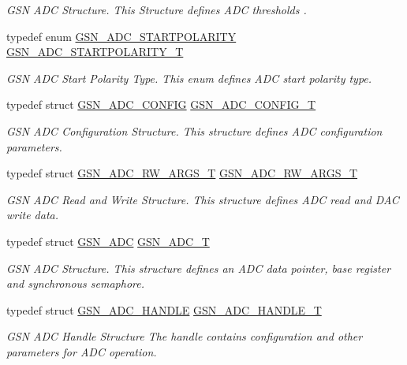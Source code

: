 \begin{DoxyCompactItemize}
\begin{DoxyCompactList}\small\item\em GSN ADC Structure. This Structure defines ADC thresholds . \end{DoxyCompactList}\item 
typedef enum \hyperlink{a00643_ga022c151fd88b9ea5c11ad9fbfb415a18}{GSN\_\-ADC\_\-STARTPOLARITY} \hyperlink{a00643_gaaafebe738a6902a342c1226ce5ea8598}{GSN\_\-ADC\_\-STARTPOLARITY\_\-T}
\begin{DoxyCompactList}\small\item\em GSN ADC Start Polarity Type. This enum defines ADC start polarity type. \end{DoxyCompactList}\item 
typedef struct \hyperlink{a00023}{GSN\_\-ADC\_\-CONFIG} \hyperlink{a00643_ga791ca7ba8984ef3e22b1790a1abd2bb4}{GSN\_\-ADC\_\-CONFIG\_\-T}
\begin{DoxyCompactList}\small\item\em GSN ADC Configuration Structure. This structure defines ADC configuration parameters. \end{DoxyCompactList}\item 
typedef struct \hyperlink{a00025}{GSN\_\-ADC\_\-RW\_\-ARGS\_\-T} \hyperlink{a00643_ga7e5745ca697790cb2b29c94299ab6070}{GSN\_\-ADC\_\-RW\_\-ARGS\_\-T}
\begin{DoxyCompactList}\small\item\em GSN ADC Read and Write Structure. This structure defines ADC read and DAC write data. \end{DoxyCompactList}\item 
typedef struct \hyperlink{a00022}{GSN\_\-ADC} \hyperlink{a00643_ga9f5c392bf9244880ab92d22101c6131d}{GSN\_\-ADC\_\-T}
\begin{DoxyCompactList}\small\item\em GSN ADC Structure. This structure defines an ADC data pointer, base register and synchronous semaphore. \end{DoxyCompactList}\item 
typedef struct \hyperlink{a00024}{GSN\_\-ADC\_\-HANDLE} \hyperlink{a00643_gac0da2e000e8dd65d554e2edf7cca8330}{GSN\_\-ADC\_\-HANDLE\_\-T}
\begin{DoxyCompactList}\small\item\em GSN ADC Handle Structure The handle contains configuration and other parameters for ADC operation. \end{DoxyCompactList}\end{DoxyCompactItemize}
